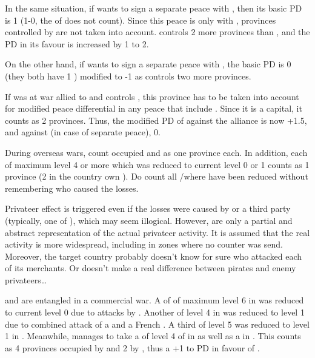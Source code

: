 \begin{exemple}
  In the same situation, if \RUS wants to sign a separate peace with \SUE,
  then its basic PD is 1 (1-0, the \STAB of \TUR does not count). Since this
  peace is only with \SUE, provinces controlled by \TUR are not taken into
  account. \RUS controls 2 more provinces than \SUE, and the PD in its favour
  is increased by 1 to 2.

  On the other hand, if \RUS wants to sign a separate peace with \TUR, the
  basic PD is 0 (they both have 1 \STAB) modified to -1 as \TUR controls two
  more provinces.
\end{exemple}

\begin{exemple}
  If \paysCrimee was at war allied to \TUR and \RUS controls \provinceCrimee,
  this province has to be taken into account for modified peace differential
  in any peace that include \TUR. Since it is a capital, it counts as 2
  provinces. Thus, the modified PD of \RUS against the alliance is now +1.5,
  and against \TUR (in case of separate peace), 0.
\end{exemple}

\label{chPeace:Privateer Effect}
\bparag During overseas wars, count occupied \COL and \TP as one province
each.
 In addition, each \TradeFLEET of maximum level 4 or
more which was reduced to current level 0 or 1 counts as 1 province (2 in the
country own \CTZ).
\bparag Do count all \CTZ/\STZ where \TradeFLEET have been reduced without
remembering who caused the losses.

\begin{designnote}
  Privateer effect is triggered even if the losses were caused by
   or a third party \corsaire (typically, one of
  \Barbaresques), which may seem illogical. However, \corsaire are only a
  partial and abstract representation of the actual privateer activity. It is
  assumed that the real activity is more widespread, including in zones where
  no counter was send. Moreover, the target country probably doesn't know for
  sure who attacked each of its merchants. Or doesn't make a real difference
  between pirates and enemy privateers\ldots
\end{designnote}

\begin{exemple}
  \FRA and \ANG are entangled in a commercial war. A \TradeFLEET of \ANG of
  maximum level 6 in  was reduced to current level 0 due to
  attacks by \leaderBart. Another \TradeFLEET of level 4 in 
  was reduced to level 1 due to combined attack of a  \corsaire
  and a French \corsaire. A third \TradeFLEET of level 5 was reduced to level
  1 in . Meanwhile, \ANG manages to take a \COL of level 4 of \FRA
  in \granderegionQuebec as well as a \TP in \continentIndia. This counts as 4
  provinces occupied by \FRA and 2 by \ANG, thus a +1 to PD in favour of \FRA.
\end{exemple}

